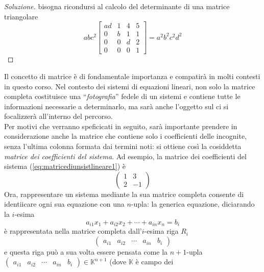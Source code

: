 \begin{proof}[Soluzione]
  \label{sol:prodeldet1}
  bisogna ricondursi al calcolo del determinante di una matrice
  triangolare
  \begin{equation*}
    abc^2
    \begin{bmatrix}
      ad & 1 & 4 & 5\\
      0 & b & 1 & 1 \\
      0 & 0 & d & 2\\
      0 & 0 & 0 & 1
    \end{bmatrix}=a^2b^2c^2d^2
  \end{equation*}
\end{proof}
Il concetto di matrice è di fondamentale importanza e compatirà in molti
contesti in questo corso. Nel contesto dei sistemi di equazioni lineari,
non solo la matrice completa costituisce una ``\emph{fotografia}'' fedele
di un sistemi e contiene tutte le informazioni necessarie a determinarlo,
ma sarà anche l'oggetto sul ci si focalizzerà all'interno del percorso.\\
Per motivi che verranno speficicati in seguito, sarà importante prendere
in considerazione anche la matrice che contiene solo i coefficienti delle
incognite, senza l'ultima colonna formata dai termini noti: si ottiene
così la cosiddetta \textit{matrice dei coefficienti del sistema}. Ad
esempio, la matrice dei coefficienti del sistema
(\ref{eq:matricediunsistlineare1}) è
\begin{equation}
  \label{eq:determinante2}
  \begin{pmatrix}
    1 & 3\\
    2 & -1
  \end{pmatrix}
\end{equation}
Ora, rappresentare un sistema mediante la sua matrice completa consente
di identiicare ogni sua equazione con una $n$-upla: la generica equazione,
diciarando la $i$-esima
\begin{equation}
  \label{eq:determinante3}
  a_{i1}x_1+a_{i2}x_2+\cdots+a_{in}x_n=b_i
\end{equation}
è rappresentata nella matrice completa dall'$i$-esima riga $R_i$
\begin{equation*}
  \begin{pmatrix}
    a_{i1} & a_{i2} & \cdots & a_{in} &b_i 
  \end{pmatrix}
\end{equation*}
e questa riga può a sua volta essere pensata come la $n+1$-upla
$\begin{pmatrix}
    a_{i1} & a_{i2} & \cdots & a_{in} &b_i 
\end{pmatrix}\in \mathds{K}^{n+1}$ (dove $\mathds{K}$ è campo dei
